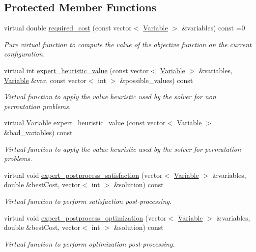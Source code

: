 \subsection*{Protected Member Functions}
\begin{DoxyCompactItemize}
\item 
virtual double \hyperlink{classghost_1_1Objective_aae6630f4fca9012278a0bf1ca1503cd0}{required\+\_\+cost} (const vector$<$ \hyperlink{classghost_1_1Variable}{Variable} $>$ \&variables) const =0
\begin{DoxyCompactList}\small\item\em Pure virtual function to compute the value of the objective function on the current configuration. \end{DoxyCompactList}\item 
virtual int \hyperlink{classghost_1_1Objective_afd240c0d36337f7204be3f2c2412e4a1}{expert\+\_\+heuristic\+\_\+value} (const vector$<$ \hyperlink{classghost_1_1Variable}{Variable} $>$ \&variables, \hyperlink{classghost_1_1Variable}{Variable} \&var, const vector$<$ int $>$ \&possible\+\_\+values) const 
\begin{DoxyCompactList}\small\item\em Virtual function to apply the value heuristic used by the solver for non permutation problems. \end{DoxyCompactList}\item 
virtual \hyperlink{classghost_1_1Variable}{Variable} \hyperlink{classghost_1_1Objective_a9d3f1799664d66a03fe34fbd3a8e66fe}{expert\+\_\+heuristic\+\_\+value} (const vector$<$ \hyperlink{classghost_1_1Variable}{Variable} $>$ \&bad\+\_\+variables) const 
\begin{DoxyCompactList}\small\item\em Virtual function to apply the value heuristic used by the solver for permutation problems. \end{DoxyCompactList}\item 
virtual void \hyperlink{classghost_1_1Objective_a5f7af74c8b54cffbff4c42a5bdf1e563}{expert\+\_\+postprocess\+\_\+satisfaction} (vector$<$ \hyperlink{classghost_1_1Variable}{Variable} $>$ \&variables, double \&best\+Cost, vector$<$ int $>$ \&solution) const 
\begin{DoxyCompactList}\small\item\em Virtual function to perform satisfaction post-\/processing. \end{DoxyCompactList}\item 
virtual void \hyperlink{classghost_1_1Objective_afcf365738f5caa5824b4fe9e411459d8}{expert\+\_\+postprocess\+\_\+optimization} (vector$<$ \hyperlink{classghost_1_1Variable}{Variable} $>$ \&variables, double \&best\+Cost, vector$<$ int $>$ \&solution) const 
\begin{DoxyCompactList}\small\item\em Virtual function to perform optimization post-\/processing. \end{DoxyCompactList}\end{DoxyCompactItemize}
